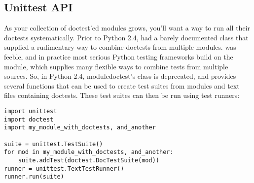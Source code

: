 \subsection{Unittest API\label{doctest-unittest-api}}

As your collection of doctest'ed modules grows, you'll want a way to run
all their doctests systematically.  Prior to Python 2.4, 
had a barely documented  class that supplied a rudimentary
way to combine doctests from multiple modules.  was feeble,
and in practice most serious Python testing frameworks build on the
 module, which supplies many flexible ways to combine
tests from multiple sources.  So, in Python 2.4, module{doctest}'s
 class is deprecated, and  provides several
functions that can be used to create  test suites from
modules and text files containing doctests.  These test suites can then be
run using  test runners:

\begin{verbatim}
import unittest
import doctest
import my_module_with_doctests, and_another

suite = unittest.TestSuite()
for mod in my_module_with_doctests, and_another:
    suite.addTest(doctest.DocTestSuite(mod))
runner = unittest.TextTestRunner()
runner.run(suite)
\end{verbatim}


